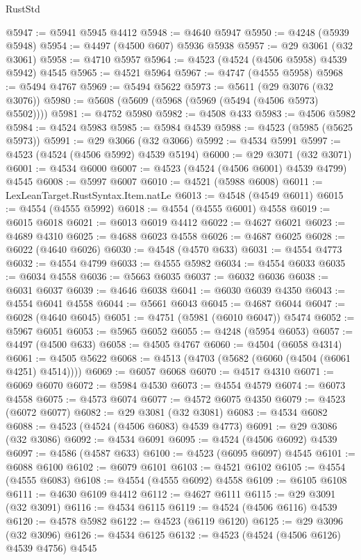 \begin{lexlean}{RustStd}
\begin{coremodule}
@5947 := @5941 @5945 @4412
@5948 := @4640 @5947
@5950 := @4248 (@5939 @5948)
@5954 := @4497 (@4500 @607) @5936 @5938
@5957 := @29 @3061 (@32 @3061)
@5958 := @4710 @5957
@5964 := @4523 (@4524 (@4506 @5958) @4539 @5942) @4545
@5965 := @4521 @5964
@5967 := @4747 (@4555 @5958)
@5968 := @5494 @4767
@5969 := @5494 @5622
@5973 := @5611 (@29 @3076 (@32 @3076))
@5980 := @5608 (@5609 (@5968 (@5969 (@5494 (@4506 @5973) @5502))))
@5981 := @4752 @5980
@5982 := @4508 @433
@5983 := @4506 @5982
@5984 := @4524 @5983
@5985 := @5984 @4539
@5988 := @4523 (@5985 (@5625 @5973))
@5991 := @29 @3066 (@32 @3066)
@5992 := @4534 @5991
@5997 := @4523 (@4524 (@4506 @5992) @4539 @5194)
@6000 := @29 @3071 (@32 @3071)
@6001 := @4534 @6000
@6007 := @4523 (@4524 (@4506 @6001) @4539 @4799) @4545
@6008 := @5997 @6007
@6010 := @4521 (@5988 @6008)
@6011 := LexLeanTarget.RustSyntax.Item.natLe
@6013 := @4548 (@4549 @6011)
@6015 := @4554 (@4555 @5992)
@6018 := @4554 (@4555 @6001) @4558
@6019 := @6015 @6018
@6021 := @6013 @6019 @4412
@6022 := @4627 @6021
@6023 := @4689 @4310
@6025 := @4688 @6023 @4558
@6026 := @4687 @6025
@6028 := @6022 (@4640 @6026)
@6030 := @4548 (@4570 @633)
@6031 := @4554 @4773
@6032 := @4554 @4799
@6033 := @4555 @5982
@6034 := @4554 @6033
@6035 := @6034 @4558
@6036 := @5663 @6035
@6037 := @6032 @6036
@6038 := @6031 @6037
@6039 := @4646 @6038
@6041 := @6030 @6039 @4350
@6043 := @4554 @6041 @4558
@6044 := @5661 @6043
@6045 := @4687 @6044
@6047 := @6028 (@4640 @6045)
@6051 := @4751 (@5981 (@6010 @6047)) @5474
@6052 := @5967 @6051
@6053 := @5965 @6052
@6055 := @4248 (@5954 @6053)
@6057 := @4497 (@4500 @633)
@6058 := @4505 @4767
@6060 := @4504 (@6058 @4314)
@6061 := @4505 @5622
@6068 := @4513 (@4703 (@5682 (@6060 (@4504 (@6061 @4251) @4514))))
@6069 := @6057 @6068
@6070 := @4517 @4310
@6071 := @6069 @6070
@6072 := @5984 @4530
@6073 := @4554 @4579
@6074 := @6073 @4558
@6075 := @4573 @6074
@6077 := @4572 @6075 @4350
@6079 := @4523 (@6072 @6077)
@6082 := @29 @3081 (@32 @3081)
@6083 := @4534 @6082
@6088 := @4523 (@4524 (@4506 @6083) @4539 @4773)
@6091 := @29 @3086 (@32 @3086)
@6092 := @4534 @6091
@6095 := @4524 (@4506 @6092) @4539
@6097 := @4586 (@4587 @633)
@6100 := @4523 (@6095 @6097) @4545
@6101 := @6088 @6100
@6102 := @6079 @6101
@6103 := @4521 @6102
@6105 := @4554 (@4555 @6083)
@6108 := @4554 (@4555 @6092) @4558
@6109 := @6105 @6108
@6111 := @4630 @6109 @4412
@6112 := @4627 @6111
@6115 := @29 @3091 (@32 @3091)
@6116 := @4534 @6115
@6119 := @4524 (@4506 @6116) @4539
@6120 := @4578 @5982
@6122 := @4523 (@6119 @6120)
@6125 := @29 @3096 (@32 @3096)
@6126 := @4534 @6125
@6132 := @4523 (@4524 (@4506 @6126) @4539 @4756) @4545

\end{coremodule}
\end{lexlean}
